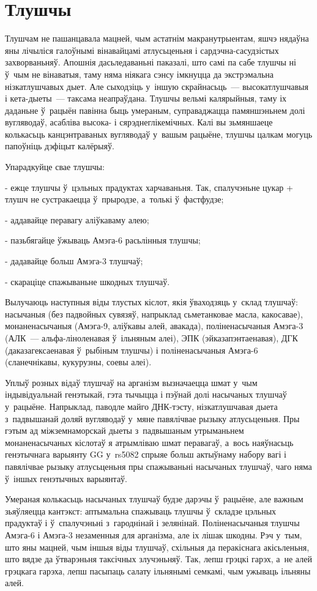 \section{Тлушчы}

Тлушчам не пашанцавала мацней, чым астатнім макранутрыентам, яшчэ нядаўна яны лічыліся галоўнымі вінавайцамі атлусьценьня і сардэчна-сасудзістых захворваньняў. Апошнія дасьледаваньні паказалі, што самі па сабе тлушчы ні ў~чым не вінаватыя, таму няма ніякага сэнсу імкнуцца да экстрэмальна нізкатлушчавых дыет. Але сыходзіць у~іншую скрайнасьць~--- высокатлушчавыя і кета-дыеты~--- таксама неапраўдана. Тлушчы вельмі калярыйныя, таму іх даданьне ў~рацыён павінна быць умераным, суправаджацца памяншэньнем долі вугляводаў, асабліва высока- і сярэднеглікемічных. Калі вы зьмяншаеце колькасьць канцэнтраваных вугляводаў у~вашым рацыёне, тлушчы цалкам могуць папоўніць дэфіцыт калёрыяў.

Упарадкуйце свае тлушчы:

- ежце тлушчы ў~цэльных прадуктах харчаваньня. Так, спалучэньне цукар + тлушч не сустракаецца ў~прыродзе, а~толькі ў~фастфудзе;

- аддавайце перавагу аліўкаваму алею;

- пазьбягайце ўжываць Амэга-6 расьлінныя тлушчы;

- дадавайце больш Амэга-3 тлушчаў;

- скараціце спажываньне шкодных тлушчаў.

Вылучаюць наступныя віды тлустых кіслот, якія ўваходзяць у~склад тлушчаў: насычаныя (без падвойных сувязяў, напрыклад сьметанковае масла, какосавае), монаненасычаныя (Амэга-9, аліўкавы алей, авакада), поліненасычаныя Амэга-3 (АЛК~--- альфа-ліноленавая ў~ільняным алеі), ЭПК (эйказапэнтаенавая), ДГК (даказагексаенавая ў~рыбіным тлушчы) і поліненасычаныя Амэга-6 (сланечнікавы, кукурузны, соевы алеі).

Уплыў розных відаў тлушчаў на арганізм вызначаецца шмат у~чым індывідуальнай генэтыкай, гэта тычыцца і пэўнай долі насычаных тлушчаў у~рацыёне. Напрыклад, паводле майго ДНК-тэсту, нізкатлушчавая дыета з~падвышанай доляй вугляводаў у~мяне павялічвае рызыку атлусьценьня. Пры гэтым ад міжземнаморскай дыеты з~падвышаным утрыманьнем монаненасычаных кіслотаў я атрымліваю шмат перавагаў, а~вось наяўнасьць генэтычнага варыянту GG у~rs5082 спрыяе больш актыўнаму набору вагі і павялічвае рызыку атлусьценьня пры спажываньні насычаных тлушчаў, чаго няма ў~іншых генэтычных варыянтаў.

Умераная колькасьць насычаных тлушчаў будзе дарэчы ў~рацыёне, але важным зьяўляецца кантэкст: аптымальна спажываць тлушчы ў~складзе цэльных прадуктаў і ў~спалучэньні з~гароднінай і зелянінай. Поліненасычаныя тлушчы Амэга-6 і Амэга-3 незаменныя для арганізма, але іх лішак шкодны. Рэч у~тым, што яны мацней, чым іншыя віды тлушчаў, схільныя да перакіснага акісьленьня, што вядзе да ўтварэньня таксічных злучэньняў. Так, лепш грэцкі гарэх, а~не алей грэцкага гарэха, лепш пасыпаць салату ільнянымі семкамі, чым ужываць ільняны алей.

